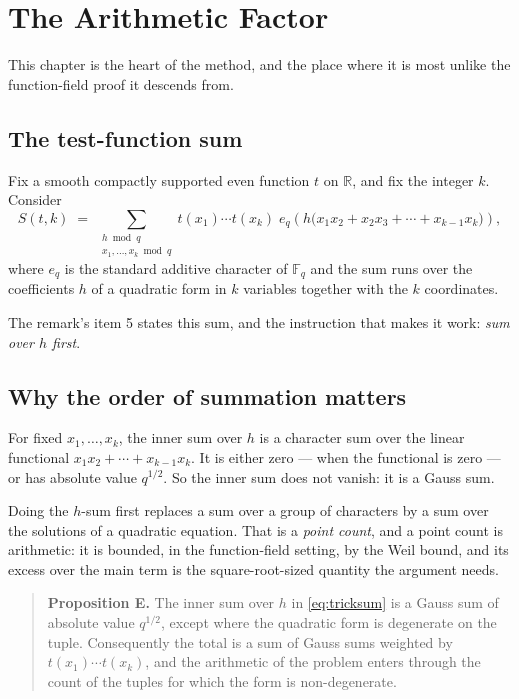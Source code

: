 
\chapter{The Arithmetic Factor}
\label{ch:count}

This chapter is the heart of the method, and the place where it is most
unlike the function-field proof it descends from.

\section{The test-function sum}Fix a smooth compactly supported even function $t$ on $\mathbb{R}$, and fix
the integer $k$. Consider
\begin{equation}
S(t,k) \;=\; \sum_{\substack{h \bmod q \\ x_1,\dots,x_k \bmod q}}
t(x_1)\cdots t(x_k)\;e_q\!\left(h\bigl(x_1x_2 + x_2x_3 + \cdots + x_{k-1}x_k\bigr)\right),
\label{eq:tricksum}
\end{equation}
where $e_q$ is the standard additive character of $\mathbb{F}_q$ and the sum
runs over the coefficients $h$ of a quadratic form in $k$ variables together
with the $k$ coordinates.

The remark's item 5 states this sum, and the instruction that makes it work:
\emph{sum over $h$ first}.

\section{Why the order of summation matters}For fixed $x_1,\dots,x_k$, the inner sum over $h$ is a character sum over the
linear functional $x_1x_2 + \cdots + x_{k-1}x_k$. It is either zero --- when
the functional is zero --- or has absolute value $q^{1/2}$. So the inner sum
does not vanish: it is a Gauss sum.

Doing the $h$-sum first replaces a sum over a group of characters by a sum
over the solutions of a quadratic equation. That is a \emph{point count}, and
a point count is arithmetic: it is bounded, in the function-field setting, by
the Weil bound, and its excess over the main term is the square-root-sized
quantity the argument needs.

\begin{quote}
\textbf{Proposition E.} The inner sum over $h$ in \eqref{eq:tricksum} is a
Gauss sum of absolute value $q^{1/2}$, except where the quadratic form is
degenerate on the tuple. Consequently the total is a sum of Gauss sums
weighted by $t(x_1)\cdots t(x_k)$, and the arithmetic of the problem enters
through the count of the tuples for which the form is non-degenerate.
\end{quote}

